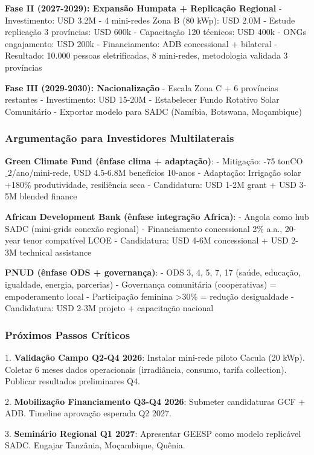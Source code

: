 \documentclass[12pt, a4paper]{article}
\begin{document}
\textbf{Fase II (2027-2029): Expansão Humpata + Replicação Regional}
- Investimento: USD 3.2M
  - 4 mini-redes Zona B (80 kWp): USD 2.0M
  - Estude replicação 3 províncias: USD 600k
  - Capacitação 120 técnicos: USD 400k
  - ONGs engajamento: USD 200k
- Financiamento: ADB concessional + bilateral
- Resultado: 10.000 pessoas eletrificadas, 8 mini-redes, metodologia validada 3 províncias

\textbf{Fase III (2029-2030): Nacionalização}
- Escala Zona C + 6 províncias restantes
- Investimento: USD 15-20M
- Estabelecer Fundo Rotativo Solar Comunitário
- Exportar modelo para SADC (Namíbia, Botswana, Moçambique)

\subsubsection{Argumentação para Investidores Multilaterais}

\textbf{Green Climate Fund (ênfase clima + adaptação)}:
- Mitigação: -75 tonCO$\_2$/ano/mini-rede, USD 4.5-6.8M benefícios 10-anos
- Adaptação: Irrigação solar +180\% produtividade, resiliência seca
- Candidatura: USD 1-2M grant + USD 3-5M blended finance

\textbf{African Development Bank (ênfase integração Africa)}:
- Angola como hub SADC (mini-grids conexão regional)
- Financiamento concessional 2\% a.a., 20-year tenor compatível LCOE
- Candidatura: USD 4-6M concessional + USD 2-3M technical assistance

\textbf{PNUD (ênfase ODS + governança)}:
- ODS 3, 4, 5, 7, 17 (saúde, educação, igualdade, energia, parcerias)
- Governança comunitária (cooperativas) = empoderamento local
- Participação feminina >30\% = redução desigualdade
- Candidatura: USD 2-3M projeto + capacitação nacional

\subsubsection{Próximos Passos Críticos}

1. \textbf{Validação Campo Q2-Q4 2026}: Instalar mini-rede piloto Cacula (20 kWp). Coletar 6 meses dados operacionais (irradiância, consumo, tarifa collection). Publicar resultados preliminares Q4.

2. \textbf{Mobilização Financiamento Q3-Q4 2026}: Submeter candidaturas GCF + ADB. Timeline aprovação esperada Q2 2027.

3. \textbf{Seminário Regional Q1 2027}: Apresentar GEESP como modelo replicável SADC. Engajar Tanzânia, Moçambique, Quênia.
\end{document}
